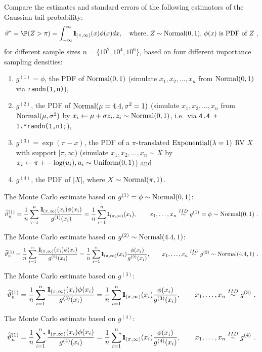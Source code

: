 \begin{labwork}[Estimating $\P(Z>\pi)$]\label{LW:GaussianTailProbs}
Compare the estimates and standard errors of the following estimators of the Gaussian tail probability: 
$$
\vartheta^* = \P(Z>\pi) = \int_{-\infty}^{\infty} \BB{1}_{(\pi,\infty)}(x) \phi(x) dx, \quad \text{where, $Z \sim \normal(0,1)$, $\phi(x)$ is PDF of $Z$} \ ,
$$
for different sample sizes $n=\{10^2,10^4, 10^6\}$, based on four different importance sampling densities:
\begin{enumerate}
\item $g^{(1)}=\phi$, the PDF of $\mbox{{\rm Normal}}(0,1)$ (simulate $x_1,x_2,\ldots,x_n$ from $\mbox{{\rm Normal}}(0,1)$ via {\tt randn(1,n)}), 
\item $g^{(2)}$, the PDF of $\mbox{{\rm Normal}}(\mu=4.4,\sigma^2=1)$ (simulate $x_1,x_2,\ldots,x_n$ from $\mbox{{\rm Normal}}(\mu,\sigma^2)$ by $x_i \gets \mu + \sigma z_i, z_i \sim \mbox{{\rm Normal}}(0,1)$, i.e.~via {\tt 4.4 + 1.*randn(1,n);}),
\item $g^{(3)} = \exp(\pi - x)$, the PDF of a $\pi$-translated $\mbox{{\rm Exponential}}(\lambda=1)$ RV $X$ with support $[\pi,\infty)$ (simulate $x_1,x_2,\ldots,x_n \sim X$ by $x_i \gets \pi + -\log(u_i), u_i \sim \mbox{{\rm Uniform}}(0,1)$) and
\item $g^{(4)}$, the PDF of $|X|$, where $X \sim \mbox{{\rm Normal}}(\pi,1)$.
\end{enumerate}

The Monte Carlo estimate based on $g^{(1)}=\phi \sim \mbox{{\rm Normal}}(0,1)$:
\[
\widehat{\vartheta}^{(1)}_n 
= \frac{1}{n} \sum_{i=1}^n \frac{\BB{1}_{(\pi,\infty)}(x_i) \phi(x_i)}{g^{(1)}(x_i)}
= \frac{1}{n} \sum_{i=1}^n \BB{1}_{(\pi,\infty)}(x_i), \qquad x_1,\ldots,x_n \overset{IID}{\sim} g^{(1)} = \phi \sim \normal(0,1) \ .
\] 

The Monte Carlo estimate based on $g^{(2)} \sim \mbox{{\rm Normal}}(4.4,1)$:
\[
\widehat{\vartheta}^{(1)}_n 
= \frac{1}{n} \sum_{i=1}^n \frac{\BB{1}_{(\pi,\infty)}(x_i) \phi(x_i)}{g^{(2)}(x_i)}
= \frac{1}{n} \sum_{i=1}^n \BB{1}_{(\pi,\infty)}(x_i)\frac{\phi(x_i)}{g^{(2)}(x_i)}, \qquad x_1,\ldots,x_n \overset{IID}{\sim} g^{(2)} \sim \normal(4.4,1) \ .
\] 

The Monte Carlo estimate based on $g^{(3)}$:
\[
\widehat{\vartheta}^{(1)}_n 
= \frac{1}{n} \sum_{i=1}^n \frac{{1}\mspace{-11 mu}{1}_{(\pi,\infty)}(x_i) \phi(x_i)}{g^{(3)}(x_i)}
= \frac{1}{n} \sum_{i=1}^n {1}\mspace{-11 mu}{1}_{(\pi,\infty)}(x_i)\frac{\phi(x_i)}{g^{(3)}(x_i)}, \qquad x_1,\ldots,x_n \overset{IID}{\sim} g^{(3)} \ .
\] 

The Monte Carlo estimate based on $g^{(4)}$:
\[
\widehat{\vartheta}^{(1)}_n 
= \frac{1}{n} \sum_{i=1}^n \frac{{1}\mspace{-11 mu}{1}_{(\pi,\infty)}(x_i) \phi(x_i)}{g^{(4)}(x_i)}
= \frac{1}{n} \sum_{i=1}^n {1}\mspace{-11 mu}{1}_{(\pi,\infty)}(x_i)\frac{\phi(x_i)}{g^{(4)}(x_i)}, \qquad x_1,\ldots,x_n \overset{IID}{\sim} g^{(4)} \ .
\] 

\end{labwork}

